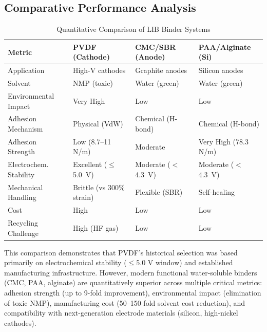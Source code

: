 \documentclass[12pt,a4paper]{article}
\begin{document}
\subsection{Comparative Performance Analysis}

\begin{table}[ht]
  \centering
  \small
  \caption{Quantitative Comparison of LIB Binder Systems}
  \label{tab:binder_comparison}
  \begin{tabular}{>{\raggedright\arraybackslash}p{3.5cm}>{\raggedright\arraybackslash}p{3cm}>{\raggedright\arraybackslash}p{3cm}>{\raggedright\arraybackslash}p{3cm}}
    \toprule
    \textbf{Metric} & \textbf{PVDF (Cathode)} & \textbf{CMC/SBR (Anode)} & \textbf{PAA/Alginate (Si)} \\
    \midrule
    Application & High-V cathodes & Graphite anodes & Silicon anodes \\
    Solvent & NMP (toxic) & Water (green) & Water (green) \\
    Environmental Impact & Very High & Low & Low \\
    Adhesion Mechanism & Physical (VdW) & Chemical (H-bond) & Chemical (H-bond) \\
    Adhesion Strength & Low (8.7--11 N/m) & Moderate & Very High (78.3 N/m) \\
    Electrochem. Stability & Excellent ($\leq$5.0~V) & Moderate ($<$4.3~V) & Moderate ($<$4.3~V) \\
    Mechanical Handling & Brittle (vs 300\% strain) & Flexible (SBR) & Self-healing \\
    Cost & High & Low & Low \\
    Recycling Challenge & High (HF gas) & Low & Low \\
    \bottomrule
  \end{tabular}
\end{table}

This comparison demonstrates that PVDF's historical selection was based primarily on electrochemical stability ($\leq$5.0 V window) and established manufacturing infrastructure. However, modern functional water-soluble binders (CMC, PAA, alginate) are quantitatively superior across multiple critical metrics: adhesion strength (up to 9-fold improvement), environmental impact (elimination of toxic NMP), manufacturing cost (50--150 fold solvent cost reduction), and compatibility with next-generation electrode materials (silicon, high-nickel cathodes).\citep{ref43,ref46,ref48,ref49}
\end{document}
